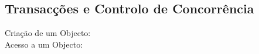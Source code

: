 \subsection{Transacções e Controlo de Concorrência}

\begin{description}
\item[Criação de um Objecto:] 

\item[Acesso a um Objecto:]  
\end{description}
